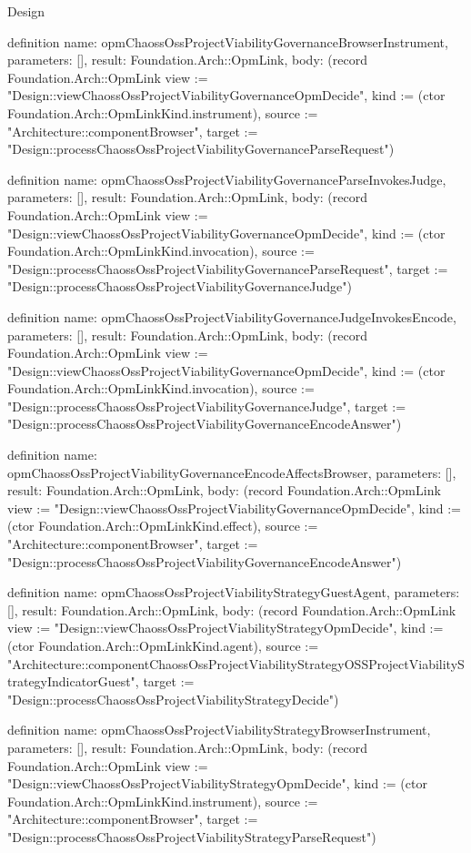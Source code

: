 \begin{lexlean}{Design}
\begin{semanticmodule}
definition{
  name: opmChaossOssProjectViabilityGovernanceBrowserInstrument,
  parameters: [],
  result: Foundation.Arch::OpmLink,
  body: (record Foundation.Arch::OpmLink {view := "Design::viewChaossOssProjectViabilityGovernanceOpmDecide", kind := (ctor Foundation.Arch::OpmLinkKind.instrument), source := "Architecture::componentBrowser", target := "Design::processChaossOssProjectViabilityGovernanceParseRequest"})
}

definition{
  name: opmChaossOssProjectViabilityGovernanceParseInvokesJudge,
  parameters: [],
  result: Foundation.Arch::OpmLink,
  body: (record Foundation.Arch::OpmLink {view := "Design::viewChaossOssProjectViabilityGovernanceOpmDecide", kind := (ctor Foundation.Arch::OpmLinkKind.invocation), source := "Design::processChaossOssProjectViabilityGovernanceParseRequest", target := "Design::processChaossOssProjectViabilityGovernanceJudge"})
}

definition{
  name: opmChaossOssProjectViabilityGovernanceJudgeInvokesEncode,
  parameters: [],
  result: Foundation.Arch::OpmLink,
  body: (record Foundation.Arch::OpmLink {view := "Design::viewChaossOssProjectViabilityGovernanceOpmDecide", kind := (ctor Foundation.Arch::OpmLinkKind.invocation), source := "Design::processChaossOssProjectViabilityGovernanceJudge", target := "Design::processChaossOssProjectViabilityGovernanceEncodeAnswer"})
}

definition{
  name: opmChaossOssProjectViabilityGovernanceEncodeAffectsBrowser,
  parameters: [],
  result: Foundation.Arch::OpmLink,
  body: (record Foundation.Arch::OpmLink {view := "Design::viewChaossOssProjectViabilityGovernanceOpmDecide", kind := (ctor Foundation.Arch::OpmLinkKind.effect), source := "Architecture::componentBrowser", target := "Design::processChaossOssProjectViabilityGovernanceEncodeAnswer"})
}

definition{
  name: opmChaossOssProjectViabilityStrategyGuestAgent,
  parameters: [],
  result: Foundation.Arch::OpmLink,
  body: (record Foundation.Arch::OpmLink {view := "Design::viewChaossOssProjectViabilityStrategyOpmDecide", kind := (ctor Foundation.Arch::OpmLinkKind.agent), source := "Architecture::componentChaossOssProjectViabilityStrategyOSSProjectViabilityStrategyIndicatorGuest", target := "Design::processChaossOssProjectViabilityStrategyDecide"})
}

definition{
  name: opmChaossOssProjectViabilityStrategyBrowserInstrument,
  parameters: [],
  result: Foundation.Arch::OpmLink,
  body: (record Foundation.Arch::OpmLink {view := "Design::viewChaossOssProjectViabilityStrategyOpmDecide", kind := (ctor Foundation.Arch::OpmLinkKind.instrument), source := "Architecture::componentBrowser", target := "Design::processChaossOssProjectViabilityStrategyParseRequest"})
}


\end{semanticmodule}
\end{lexlean}
